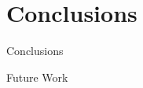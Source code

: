 
\section{Conclusions}
\begin{frame}{Conclusions}
\end{frame}
\begin{frame}{Future Work}
\end{frame}